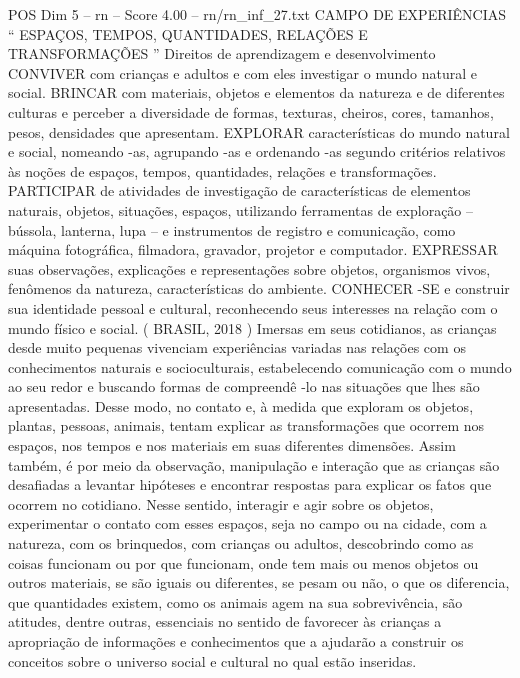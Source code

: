 \begin{textsample}{POS Dim 5 – rn – Score 4.00 – rn/rn\_inf\_27.txt}  \label{ex:f5_pos_147}
CAMPO DE EXPERIÊNCIAS “ ESPAÇOS, TEMPOS, QUANTIDADES, RELAÇÕES E TRANSFORMAÇÕES ” Direitos de aprendizagem e desenvolvimento CONVIVER com crianças e adultos e com eles investigar o mundo natural e social.
BRINCAR com materiais, objetos e elementos da natureza e de diferentes culturas e perceber a diversidade de formas, texturas, cheiros, cores, tamanhos, pesos, densidades que apresentam.
EXPLORAR características do mundo natural e social, nomeando -as, agrupando -as e ordenando -as segundo critérios relativos às noções de espaços, tempos, quantidades, relações e transformações.
PARTICIPAR de atividades de investigação de características de elementos naturais, objetos, situações, espaços, utilizando ferramentas de exploração – bússola, lanterna, lupa – e instrumentos de registro e comunicação, como máquina fotográfica, filmadora, gravador, projetor e computador.
EXPRESSAR suas observações, explicações e representações sobre objetos, organismos vivos, fenômenos da natureza, características do ambiente.
CONHECER -SE e construir sua identidade pessoal e cultural, reconhecendo seus interesses na relação com o mundo físico e social. ( BRASIL, 2018 ) Imersas em seus cotidianos, as crianças desde muito pequenas vivenciam experiências variadas nas relações com os conhecimentos naturais e socioculturais, estabelecendo comunicação com o mundo ao seu redor e buscando formas de compreendê -lo nas situações que lhes são apresentadas.
Desse modo, no contato e, à medida que exploram os objetos, plantas, pessoas, animais, tentam explicar as transformações que ocorrem nos espaços, nos tempos e nos materiais em suas diferentes dimensões.
Assim também, é por meio da observação, manipulação e interação que as crianças são desafiadas a levantar hipóteses e encontrar respostas para explicar os fatos que ocorrem no cotidiano.
Nesse sentido, interagir e agir sobre os objetos, experimentar o contato com esses espaços, seja no campo ou na cidade, com a natureza, com os brinquedos, com crianças ou adultos, descobrindo como as coisas funcionam ou por que funcionam, onde tem mais ou menos objetos ou outros materiais, se são iguais ou diferentes, se pesam ou não, o que os diferencia, que quantidades existem, como os animais agem na sua sobrevivência, são atitudes, dentre outras, essenciais no sentido de favorecer às crianças a apropriação de informações e conhecimentos que a ajudarão a construir os conceitos sobre o universo social e cultural no qual estão inseridas.

\end{textsample}
